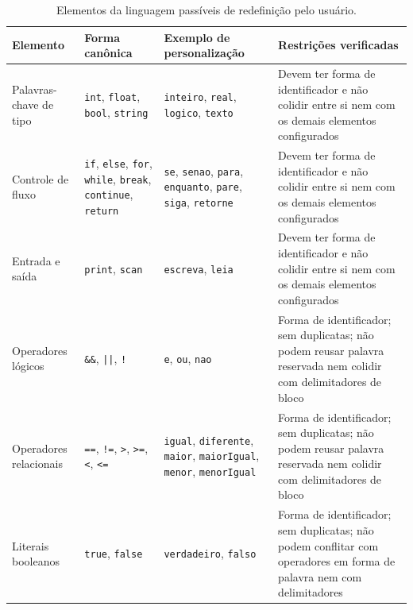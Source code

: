 \begin{table}[htbp]
    \centering
    \caption{Elementos da linguagem passíveis de redefinição pelo usuário.}
    \label{tab:elementos-configuraveis}
    \footnotesize
    \setlength{\tabcolsep}{4pt}
    \renewcommand{\arraystretch}{1.25}
    \begin{tabular}{|>{\raggedright\arraybackslash}p{2.5cm}|>{\raggedright\arraybackslash}p{2.6cm}|>{\raggedright\arraybackslash}p{2.9cm}|>{\raggedright\arraybackslash}p{5.2cm}|}
        \hline
        \textbf{Elemento} & \textbf{Forma canônica} & \textbf{Exemplo de personalização} & \textbf{Restrições verificadas} \\
        \hline
        Palavras-chave de tipo & \texttt{int}, \texttt{float}, \texttt{bool}, \texttt{string} & \texttt{inteiro}, \texttt{real}, \texttt{logico}, \texttt{texto} & Devem ter forma de identificador e não colidir entre si nem com os demais elementos configurados \\
        \hline
        Controle de fluxo & \texttt{if}, \texttt{else}, \texttt{for}, \texttt{while}, \texttt{break}, \texttt{continue}, \texttt{return} & \texttt{se}, \texttt{senao}, \texttt{para}, \texttt{enquanto}, \texttt{pare}, \texttt{siga}, \texttt{retorne} & Devem ter forma de identificador e não colidir entre si nem com os demais elementos configurados \\
        \hline
        Entrada e saída & \texttt{print}, \texttt{scan} & \texttt{escreva}, \texttt{leia} & Devem ter forma de identificador e não colidir entre si nem com os demais elementos configurados \\
        \hline
        Operadores lógicos & \texttt{\&\&}, \texttt{||}, \texttt{!} & \texttt{e}, \texttt{ou}, \texttt{nao} & Forma de identificador; sem duplicatas; não podem reusar palavra reservada nem colidir com delimitadores de bloco \\
        \hline
        Operadores relacionais & \texttt{==}, \texttt{!=}, \texttt{>}, \texttt{>=}, \texttt{<}, \texttt{<=} & \texttt{igual}, \texttt{diferente}, \texttt{maior}, \texttt{maiorIgual}, \texttt{menor}, \texttt{menorIgual} & Forma de identificador; sem duplicatas; não podem reusar palavra reservada nem colidir com delimitadores de bloco \\
        \hline
        Literais booleanos & \texttt{true}, \texttt{false} & \texttt{verdadeiro}, \texttt{falso} & Forma de identificador; sem duplicatas; não podem conflitar com operadores em forma de palavra nem com delimitadores \\

\end{tabular}
\end{table}
